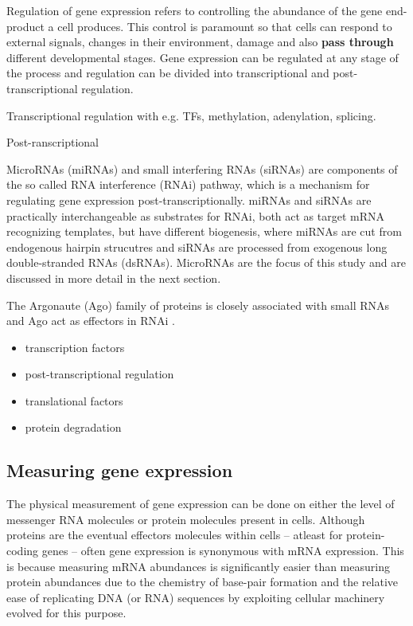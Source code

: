 Regulation of gene expression refers to controlling the abundance of
the gene end-product a cell produces. This control is paramount so that cells
can respond to external signals, changes in their environment, damage and also 
\textbf{pass through} different developmental stages. Gene expression can be regulated
at any stage of the process and regulation can be divided into transcriptional
and post-transcriptional regulation.

Transcriptional regulation with e.g. TFs, methylation, adenylation, splicing.

Post-ranscriptional

MicroRNAs (miRNAs) and small interfering RNAs (siRNAs) are components of the
so called RNA interference (RNAi) pathway, which is a mechanism for regulating
gene expression post-transcriptionally. miRNAs and siRNAs are practically
interchangeable as substrates for RNAi, both act as target mRNA recognizing
templates, but have different biogenesis, where miRNAs are cut from endogenous hairpin
strucutres and siRNAs are processed from exogenous long double-stranded RNAs (dsRNAs).
\cite{Du2005} MicroRNAs are the focus of this study and are discussed in more
detail in the next section.

The Argonaute (Ago) family of proteins is closely associated with small RNAs and
Ago act as effectors in RNAi \cite{Ha2014}.

\begin{itemize}
  \item transcription factors
  \item post-transcriptional regulation
  \item translational factors
  \item protein degradation
\end{itemize}


\subsection{Measuring gene expression}\label{measurement-of-gene-expression}

The physical measurement of gene expression can be done on either the level of
messenger RNA molecules or protein molecules present in cells. Although
proteins are the eventual effectors molecules within cells -- atleast for
protein-coding genes -- often gene expression is synonymous with mRNA
expression. This is because measuring mRNA abundances is significantly easier than
measuring protein abundances due to the chemistry of base-pair formation
and the relative ease of replicating DNA (or RNA) sequences by
exploiting cellular machinery evolved for this purpose.


